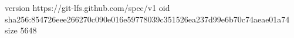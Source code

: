 version https://git-lfs.github.com/spec/v1
oid sha256:854726eee266270c090e016e59778039c351526ea237d99e6b70c74aeae01a74
size 5648
